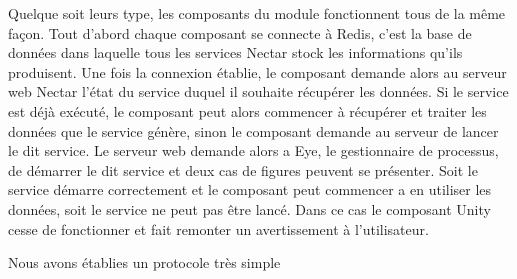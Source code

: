 

Quelque soit leurs type, les composants du module fonctionnent tous de la même façon. Tout d'abord chaque composant se connecte à Redis, c'est la base de données dans laquelle tous les services Nectar stock les informations qu'ils produisent. Une fois la connexion établie, le composant demande alors au serveur web Nectar l'état du service duquel il souhaite récupérer les données. Si le service est déjà exécuté, le composant peut alors commencer à récupérer et traiter les données que le service génère, sinon le composant demande au serveur de lancer le dit service. Le serveur web demande alors a Eye, le gestionnaire de processus, de démarrer le dit service et deux cas de figures peuvent se présenter. Soit le service démarre correctement et le composant peut commencer a en utiliser les données, soit le service ne peut pas être lancé. Dans ce cas le composant Unity cesse de fonctionner et fait remonter un avertissement à l'utilisateur.


Nous avons établies un protocole très simple



